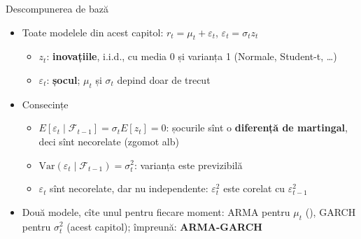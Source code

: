 \begin{frame}{Descompunerea de bază}
\itemsize{\small}
\begin{itemize}
    \item Toate modelele din acest capitol: $r_t = \mu_t + \varepsilon_t$, \quad $\varepsilon_t = \sigma_t z_t$
    \begin{itemize}
        \item $z_t$: \textbf{inovațiile}, i.i.d., cu media 0 și varianța 1 (Normale, Student-t, \dots)
        \item $\varepsilon_t$: \textbf{șocul}; $\mu_t$ și $\sigma_t$ depind doar de trecut
    \end{itemize}
    \item Consecințe
    \begin{itemize}
        \item $E[\varepsilon_t \mid \mathcal{F}_{t-1}] = \sigma_t E[z_t] = 0$: șocurile sînt o \textbf{diferență de martingal}, deci sînt necorelate (zgomot alb)
        \item $\mathrm{Var}(\varepsilon_t \mid \mathcal{F}_{t-1}) = \sigma_t^2$: varianța este previzibilă
        \item $\varepsilon_t$ sînt necorelate, dar nu independente: $\varepsilon_t^2$ este corelat cu $\varepsilon_{t-1}^2$
    \end{itemize}
    \item Două modele, cîte unul pentru fiecare moment: ARMA pentru $\mu_t$ (), GARCH pentru $\sigma_t^2$ (acest capitol); împreună: \textbf{ARMA-GARCH}
\end{itemize}
\end{frame}

